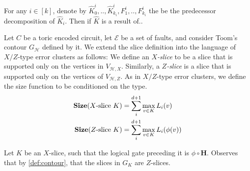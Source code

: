   \begin{corollary}
    For any $i \in [k]$, denote by $\hat{K}_{0}^{i},..,\hat{K}_{k_{i}}^{i},F_{1}^{i},..,F_{k_{i}}^{i}$ the be the predecessor decomposition of $\hat{K}_{i}$. Then if $\hat{K}$ is a result of..
  \end{corollary}
  \begin{definition}
Let $C$ be a toric encoded circuit, let $\mathcal{E}$ be a set of faults, and consider Toom's contour $G_{\mathcal{H}}$ defined by it. We extend the slice definition into the language of $X/Z$-type error clusters as follows: We define an \textit{$X$-slice} to be a slice that is supported only on the vertices in $V_{\mathcal{H},X}$. Similarly, a \textit{$Z$-slice} is a slice that is supported only on the vertices of $V_{\mathcal{H},Z}$. As in $X/Z$-type error clusters, we define the size function to be conditioned on the type.
    \begin{equation*}
      \begin{split}
        \mathbf{Size}( X\text{-slice } K ) & = \sum_{i}^{d+1} \max_{v \in K} L_{i}(v)\\ 
        \mathbf{Size}( Z\text{-slice } K ) & = \sum_{i}^{d+1} \max_{v \in K} L_{i}(\phi(v))\\ 
      \end{split}
    \end{equation*}
  \end{definition}
  \begin{claim}
    Let $K$ be an $X$-slice, such that the logical gate preceding it is $\phi \circ \mathbf{H}$. Observes that by \cref{def:contour}, that the slices in $G_{K}$ are $Z$-slices.   
  \end{claim}



